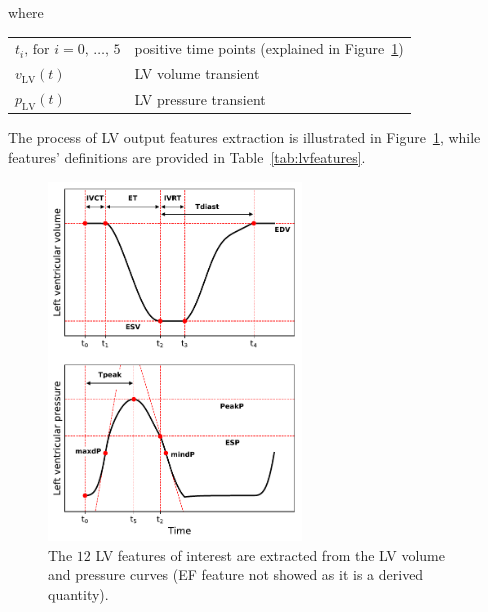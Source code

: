 \noindent
where

\vspace{0.2cm}
\begin{tabular}{ll}
    $t_i,\,\text{for}\,\,i=0,\,\dots,\,5$ & positive time points (explained in Figure~\ref{fig:lvfeatsextraction}) \\
    $v_{\textrm{LV}}(t)$ & LV volume transient \\
    $p_{\textrm{LV}}(t)$ & LV pressure transient
\end{tabular}

\vspace{0.2cm}\noindent
The process of LV output features extraction is illustrated in Figure~\ref{fig:lvfeatsextraction}, while features' definitions are provided in Table~\ref{tab:lvfeatures}.

\begin{figure}[ht!]
    \myfloatalign
    \includegraphics[width=0.6\textwidth]{figures/chapter03/lvv_lvp_features_explained_together.pdf}
    \caption{The $12$ LV features of interest are extracted from the LV volume and pressure curves (EF feature not showed as it is a derived quantity).}
    \label{fig:lvfeatsextraction}
\end{figure}
    
